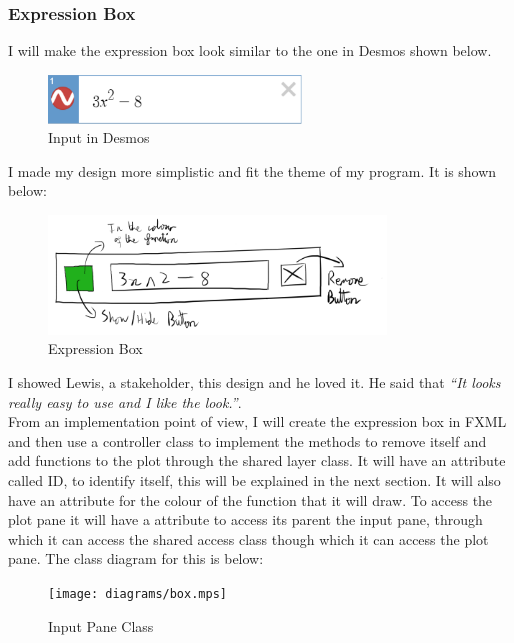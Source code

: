 \documentclass[../../../../main.tex]{subfiles}
\begin{document}
\subsubsection{Expression Box}
I will make the expression box look similar to the one in Desmos shown below.
\begin{figure}[H]
	\centering
	\includegraphics[width=0.6\textwidth]{images/desmos}
	\caption{Input in Desmos}
\end{figure}\noindent
I made my design more simplistic and fit the theme of my program. It is shown below:
\begin{figure}[H]
	\centering
	\includegraphics[width=0.8\textwidth]{images/expressionBox}
	\caption{Expression Box}
\end{figure}
I showed Lewis, a stakeholder, this design and he loved it. He said that \textit{``It looks really easy to use and I like the look.''}.\\
From an implementation point of view, I will create the expression box in FXML and then use a controller class to implement the methods to remove itself and add functions to the plot through the shared layer class. It will have an attribute called ID, to identify itself, this will be explained in the next section. It will also have an attribute for the colour of the function that it will draw. To access the plot pane it will have a attribute to access its parent the input pane, through which it can access the shared access class though which it can access the plot pane. The class diagram for this is below:
\begin{figure}[H]
	\centering
	\texttt{[image: diagrams/box.mps]}
	\caption{Input Pane Class}
\end{figure}
\newpage
\end{document}
